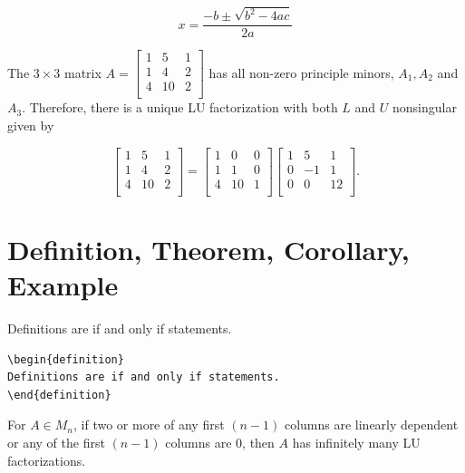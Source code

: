 \begin{equation}\label{eqn:quad}
x = \frac{-b \pm \sqrt{b^2 - 4ac}}{2a}
\end{equation}
  
\begin{example}\normalfont
The $3 \times 3$ matrix  
$A =  \begin{bmatrix}
1 & 5 & 1\\
1 & 4 & 2\\
4 & 10 & 2\\
\end{bmatrix}
$
has all non-zero principle minors, $A_1, A_2$ and $A_3$.  Therefore,  there is a unique LU factorization with both $L$ and $U$ nonsingular given by 
\end{example}
\[
\begin{bmatrix}
1 & 5 & 1\\
1 & 4 & 2\\
4 & 10 & 2\\
\end{bmatrix}
=
\begin{bmatrix}
1 & 0 & 0\\
1 & 1 & 0\\
4 & 10 & 1\\
\end{bmatrix}
\begin{bmatrix}
1 & 5 & 1\\
0 & -1 & 1\\
0 & 0 & 12\\
\end{bmatrix}.
\]
 
 
  
 
\section{Definition, Theorem, Corollary, Example}


\begin{definition}
Definitions are if and only if statements.  
\end{definition}

\begin{verbatim}
\begin{definition}
Definitions are if and only if statements.  
\end{definition}
\end{verbatim}

\begin{theorem}
{For $A \in M_n$, if two or more of any first $(n-1)$ columns are linearly dependent or any of the first $(n-1)$ columns are 0, then $A$ has infinitely many LU factorizations.}
\end{theorem}

